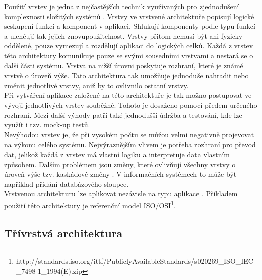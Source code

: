 \documentclass[ing,male,java,dept456]{diploma}						%
\begin{document}
Použití vrstev je jedna z nejčastějších technik využívaných pro zjednodušení komplexnosti složitých systémů \cite{fowler}. Vrstvy ve vrstvené architektuře popisují logické seskupení funkcí a komponent v aplikaci. Shlukují komponenty podle typu funkcí a ulehčují tak jejich znovupoužitelnost. Vrstvy přitom nemusí být ani fyzicky oddělené, pouze vymezují a rozdělují aplikaci do logických celků. Každá z vrstev této architektury komunikuje pouze se svými sousedními vrstvami a nestará se o další části systému. Vrstva na nižší úrovni poskytuje rozhraní, které je známé vrstvě o úroveň výše. Tato architektura tak umožňuje jednoduše nahradit nebo změnit jednotlivé vrstvy, aniž by to ovlivnilo ostatní vrstvy. \\
Při vytváření aplikace založené na této architektuře je tak možno postupovat ve vývoji jednotlivých vrstev souběžně. Tohoto je dosaženo pomocí předem určeného rozhraní. Mezi další výhody patří také jednodušší údržba a testování, kde lze využít i tzv. mock-up testů. \\
Nevýhodou vrstev je, že při vysokém počtu se můžou velmi negativně projevovat na výkonu celého systému. Nejvýraznějším vlivem je potřeba rozhraní pro převod dat, jelikož každá z vrstev má vlastní logiku a interpretuje data vlastním způsobem. Dalším problémem jsou změny, které ovlivňují všechny vrstvy o úroveň výše tzv. kaskádové změny \cite{dresler}. V informačních systémech to může být například přidání databázového sloupce. \\
Vrstvenou architekturu lze aplikovat nezávisle na typu aplikace \cite{msdn}. Příkladem použití této architektury je referenční model ISO/OSI\footnote{ http://standards.iso.org/ittf/PubliclyAvailableStandards/s020269\_ISO\_IEC\_7498-1\_1994(E).zip}. \\

\subsection{Třívrstvá architektura}
\end{document}
